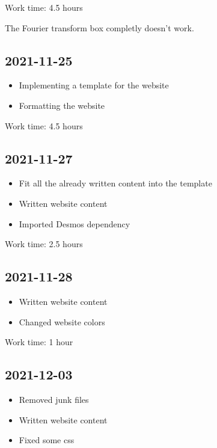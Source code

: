 \documentclass{article}
\begin{document}
Work time: 4.5 hours

The Fourier transform box completly doesn't work.

\subsection*{2021-11-25}

\begin{itemize}
    \item Implementing a template for the website
    \item Formatting the website
\end{itemize}

Work time: 4.5 hours

\subsection*{2021-11-27}

\begin{itemize}
    \item Fit all the already written content into the template
    \item Written website content
    \item Imported Desmos dependency
\end{itemize}

Work time: 2.5 hours

\subsection*{2021-11-28}

\begin{itemize}
    \item Written website content
    \item Changed website colors
\end{itemize}

Work time: 1 hour

\subsection*{2021-12-03}

\begin{itemize}
    \item Removed junk files
    \item Written website content
    \item Fixed some css
\end{itemize}
\end{document}
